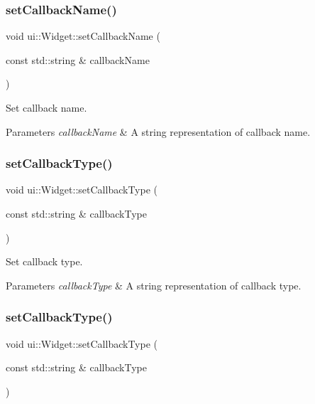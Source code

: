 \subsubsection{\texorpdfstring{set\+Callback\+Name()}{setCallbackName()}\hspace{0.1cm}{\footnotesize\ttfamily [2/2]}}
{\footnotesize\ttfamily void ui\+::\+Widget\+::set\+Callback\+Name (\begin{DoxyParamCaption}\item[{const std\+::string \&}]{callback\+Name }\end{DoxyParamCaption})\hspace{0.3cm}{\ttfamily [inline]}}

Set callback name. 
\begin{DoxyParams}{Parameters}
{\em callback\+Name} & A string representation of callback name. \\
\hline
\end{DoxyParams}
\mbox{\label{classui_1_1Widget_a98c80020539ad23efcad93fd5e42749d}} 
\subsubsection{\texorpdfstring{set\+Callback\+Type()}{setCallbackType()}\hspace{0.1cm}{\footnotesize\ttfamily [1/2]}}
{\footnotesize\ttfamily void ui\+::\+Widget\+::set\+Callback\+Type (\begin{DoxyParamCaption}\item[{const std\+::string \&}]{callback\+Type }\end{DoxyParamCaption})\hspace{0.3cm}{\ttfamily [inline]}}

Set callback type. 
\begin{DoxyParams}{Parameters}
{\em callback\+Type} & A string representation of callback type. \\
\hline
\end{DoxyParams}
\mbox{\label{classui_1_1Widget_a98c80020539ad23efcad93fd5e42749d}} 
\subsubsection{\texorpdfstring{set\+Callback\+Type()}{setCallbackType()}\hspace{0.1cm}{\footnotesize\ttfamily [2/2]}}
{\footnotesize\ttfamily void ui\+::\+Widget\+::set\+Callback\+Type (\begin{DoxyParamCaption}\item[{const std\+::string \&}]{callback\+Type }\end{DoxyParamCaption})\hspace{0.3cm}{\ttfamily [inline]}}

